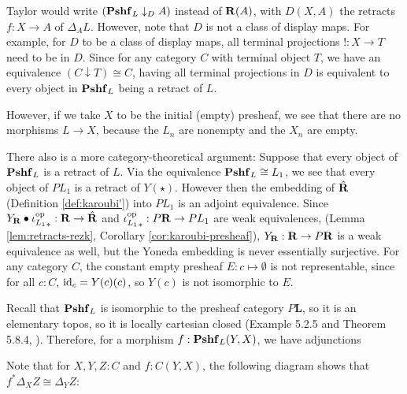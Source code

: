 \begin{remark}
  Taylor would write $ (\mathbf{Pshf}_{L} \downarrow_D A) $ instead of $ \mathbf{R}(A) $, with $ D(X, A) $ the retracts $ f: X \to A $ of $ \Delta_A L $. However, note that $ D $ is not a class of display maps. For example, for $ D $ to be a class of display maps, all terminal projections $ ! : X \to T $ need to be in $ D $. Since for any category $ C $ with terminal object $ T $, we have an equivalence $ (C \downarrow T) \cong C $, having all terminal projections in $ D $ is equivalent to every object in $ \mathbf{Pshf}_{L} $ being a retract of $ L $.

  However, if we take $ X $ to be the initial (empty) presheaf, we see that there are no morphisms $ L \to X $, because the $ L_n $ are nonempty and the $ X_n $ are empty.

  There also is a more category-theoretical argument: Suppose that every object of $ \mathbf{Pshf}_{L} $ is a retract of $ L $. Via the equivalence $ \mathbf{Pshf}_{L} \cong L_1 $, we see that every object of $ P L_1 $ is a retract of $ Y(\star) $. However then the embedding of $ \hat {\mathbf{R}} $ (Definition \ref{def:karoubi'}) into $ P L_1 $ is an adjoint equivalence. Since $ Y_{\mathbf{R}} \bullet {\ensuremath{\iota_{L_1}^{\text{op}}}}_* : \mathbf{R} \to \hat {\mathbf{R}} $ and $ {\iota_{L_1}^{\text{op}}}_* : P \mathbf{R} \to P L_1 $ are weak equivalences, (Lemma \ref{lem:retracts-rezk}, Corollary \ref{cor:karoubi-presheaf}), $ Y_{\mathbf{R}} : \mathbf{R} \to P \mathbf{R} $ is a weak equivalence as well, but the Yoneda embedding is never essentially surjective. For any category $ C $, the constant empty presheaf $ E: c \mapsto \emptyset $ is not representable, since for all $ c : C $, $ \text{id}_{c} = Y(c)(c) $, so $ Y(c) $ is not isomorphic to $ E $.
\end{remark}

Recall that $ \mathbf{Pshf}_{L} $ is isomorphic to the presheaf category $ P \mathbf L $, so it is an elementary topos, so it is locally cartesian closed (Example 5.2.5 and Theorem 5.8.4, \cite{borceux-3}). Therefore, for a morphism $ f: \mathbf{Pshf}_{L}(Y, X) $, we have adjunctions
\begin{center}
\end{center}

\begin{remark}\label{rem:pullback-of-projection}
  Note that for $ X, Y, Z : C $ and $ f: C(Y, X) $, the following diagram shows that $ f^* \Delta_X Z \cong \Delta_Y Z $:
  \begin{center}
  \end{center}
\end{remark}

